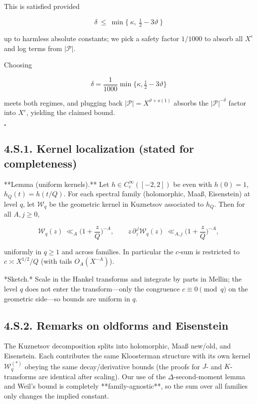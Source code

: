 \documentclass[11pt]{article}
\theoremstyle{definition}
\theoremstyle{remark}
\begin{document}
  This is satisfied provided

  $$
  \delta\ \le\ \min\Big\{\ \kappa,\ \tfrac12-3\vartheta\ \Big\}
  $$

  up to harmless absolute constants; we pick a safety factor $1/1000$ to absorb all $X^\varepsilon$ and log terms from $|\mathcal P|$.

Choosing

$$
\delta=\frac1{1000}\min\{\kappa,\tfrac12-3\vartheta\}
$$

meets both regimes, and plugging back $|\mathcal P|=X^{\vartheta+o(1)}$ absorbs the $|\mathcal P|^{-\delta}$ factor into $X^\varepsilon$, yielding the claimed bound.

$\square$

\subsection*{4.S.1. Kernel localization (stated for completeness)}

**Lemma (uniform kernels).**
Let $h\in C_c^\infty([-2,2])$ be even with $h(0)=1$, $h_Q(t)=h(t/Q)$. For each spectral family (holomorphic, Maaß, Eisenstein) at level $q$, let $\mathcal W_q$ be the geometric kernel in Kuznetsov associated to $h_Q$. Then for all $A,j\ge0$,

$$
\mathcal W_q(z)\ \ll_A\Big(1+\frac zQ\Big)^{-A},\qquad
z\,\partial_z^{\,j}\mathcal W_q(z)\ \ll_{A,j}\Big(1+\frac zQ\Big)^{-A},
$$

uniformly in $q\ge 1$ and across families. In particular the $c$-sum is restricted to $c\asymp X^{1/2}/Q$ (with tails $O_A(X^{-A})$).

*Sketch.* Scale in the Hankel transforms and integrate by parts in Mellin; the level $q$ does not enter the transform—only the congruence $c\equiv 0\pmod q$ on the geometric side—so bounds are uniform in $q$.

\subsection*{4.S.2. Remarks on oldforms and Eisenstein}

The Kuznetsov decomposition splits into holomorphic, Maaß new/old, and Eisenstein. Each contributes the same Kloosterman structure with its own kernel $\mathcal W_q^{(*)}$ obeying the same decay/derivative bounds (the proofs for $J$- and $K$-transforms are identical after scaling). Our use of the $\Delta$-second-moment lemma and Weil’s bound is completely **family-agnostic**, so the sum over all families only changes the implied constant.
\end{document}
